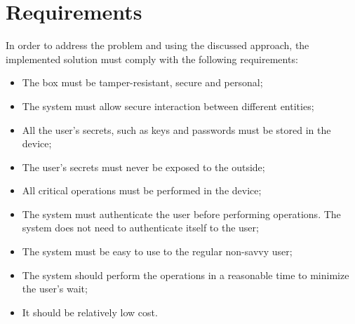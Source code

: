 
\section{Requirements} \label{chap:intro:requirements}

In order to address the problem and using the discussed approach, the implemented solution must comply with the following requirements:
\begin{itemize}
	\item The box must be tamper-resistant, secure and personal;
	\item The system must allow secure interaction between different entities;
	\item All the user's secrets, such as keys and passwords must be stored in the device;
	\item The user's secrets must never be exposed to the outside;
	\item All critical operations must be performed in the device;
	\item The system must authenticate the user before performing operations. The system does not need to authenticate itself to the user;
	\item The system must be easy to use to the regular non-savvy user;
	\item The system should perform the operations in a reasonable time to minimize the user's wait;
	\item It should be relatively low cost.
\end{itemize}
